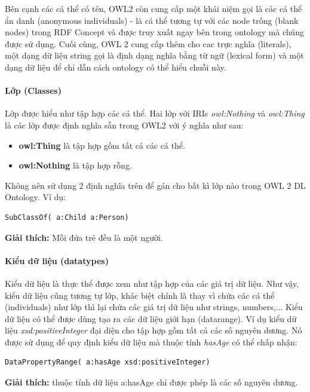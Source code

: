 Bên cạnh các cá thể có tên, OWL2 còn cung cấp một khái niệm gọi là các cá thể ẩn danh (anonymous individuals) - là cá thể tương tự với các node trống (blank nodes) trong RDF Concept \cite{rdf_concept} và được truy xuất ngay bên trong ontology mà chúng được sử dụng. Cuối cùng, OWL 2 cung cấp thêm cho cac trực nghĩa (literals), một dạng dữ liệu string gọi là định dạng nghĩa bằng từ ngữ (lexical form) và một dạng dữ liệu để chỉ dẫn cách ontology có thể hiểu chuỗi này.
\paragraph{Lớp (Classes)}
Lớp được hiểu như tập hợp các cá thể. Hai lớp với IRIs \textit{owl:Nothing} và \textit{owl:Thing} là các lớp được định nghĩa sẵn trong OWL2 với ý nghĩa như sau:
\begin{itemize}
	\item \textbf{owl:Thing} là tập hợp gồm tất cả các cá thể.
	\item \textbf{owl:Nothing} là tập hợp rỗng.
\end{itemize}
Không nên sử dụng 2 định nghĩa trên để gán cho bất kì lớp nào trong OWL 2 DL Ontology. 
Ví dụ:
\begin{verbatim}
SubClassOf( a:Child a:Person) 
\end{verbatim}
\textbf{Giải thích:} Mỗi đứa trẻ đều là một người.

\paragraph{Kiểu dữ liệu (datatypes)}
Kiểu dữ liệu là thực thể được xem như tập hợp của các giá trị dữ liệu. Như vậy, kiểu dữ liệu cũng tương tự lớp, khác biệt chính là thay vì chứa các cá thể (individuals) như lớp thì lại chứa các giá trị dữ liệu như strings, numbers,... Kiểu dữ liệu có thể được dùng tạo ra các dữ liệu giới hạn (datarange). Ví dụ kiểu dữ liệu \textit{xsd:positiveInteger} đại diện cho tập hợp gồm tất cả các số nguyên dương. Nó được sử dụng để quy định kiểu dữ liệu mà thuộc tính \textit{hasAge} có thể chấp nhận:
\begin{verbatim}
DataPropertyRange( a:hasAge xsd:positiveInteger) 
\end{verbatim}
\textbf{Giải thích:} thuộc tính dữ liệu a:hasAge chỉ được phép là các số nguyên dương.

